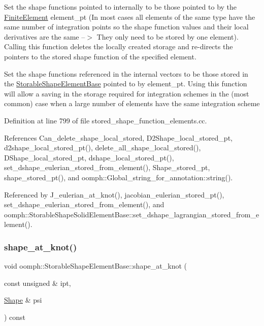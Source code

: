 Set the shape functions pointed to internally to be those pointed to by the \hyperlink{classoomph_1_1FiniteElement}{Finite\+Element} element\+\_\+pt (In most cases all elements of the same type have the same number of integration points so the shape function values and their local derivatives are the same --$>$ They only need to be stored by one element). Calling this function deletes the locally created storage and re-\/directs the pointers to the stored shape function of the specified element. 

Set the shape functions referenced in the internal vectors to be those stored in the \hyperlink{classoomph_1_1StorableShapeElementBase}{Storable\+Shape\+Element\+Base} pointed to by element\+\_\+pt. Using this function will allow a saving in the storage required for integration schemes in the (most common) case when a large number of elements have the same integration scheme 

Definition at line 799 of file stored\+\_\+shape\+\_\+function\+\_\+elements.\+cc.



References Can\+\_\+delete\+\_\+shape\+\_\+local\+\_\+stored, D2\+Shape\+\_\+local\+\_\+stored\+\_\+pt, d2shape\+\_\+local\+\_\+stored\+\_\+pt(), delete\+\_\+all\+\_\+shape\+\_\+local\+\_\+stored(), D\+Shape\+\_\+local\+\_\+stored\+\_\+pt, dshape\+\_\+local\+\_\+stored\+\_\+pt(), set\+\_\+dshape\+\_\+eulerian\+\_\+stored\+\_\+from\+\_\+element(), Shape\+\_\+stored\+\_\+pt, shape\+\_\+stored\+\_\+pt(), and oomph\+::\+Global\+\_\+string\+\_\+for\+\_\+annotation\+::string().



Referenced by J\+\_\+eulerian\+\_\+at\+\_\+knot(), jacobian\+\_\+eulerian\+\_\+stored\+\_\+pt(), set\+\_\+dshape\+\_\+eulerian\+\_\+stored\+\_\+from\+\_\+element(), and oomph\+::\+Storable\+Shape\+Solid\+Element\+Base\+::set\+\_\+dshape\+\_\+lagrangian\+\_\+stored\+\_\+from\+\_\+element().

\mbox{\label{classoomph_1_1StorableShapeElementBase_a162150b9480132ac350404291281eb3b}} 
\subsubsection{\texorpdfstring{shape\+\_\+at\+\_\+knot()}{shape\_at\_knot()}}
{\footnotesize\ttfamily void oomph\+::\+Storable\+Shape\+Element\+Base\+::shape\+\_\+at\+\_\+knot (\begin{DoxyParamCaption}\item[{const unsigned \&}]{ipt,  }\item[{\hyperlink{classoomph_1_1Shape}{Shape} \&}]{psi }\end{DoxyParamCaption}) const\hspace{0.3cm}{\ttfamily [virtual]}}



